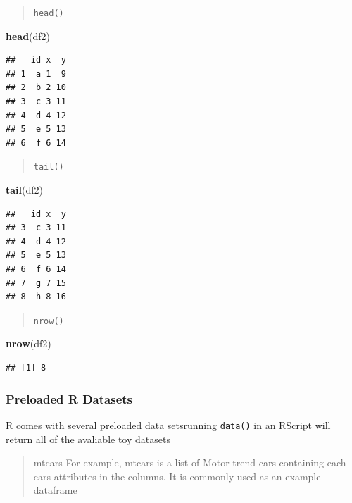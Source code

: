 \documentclass[
]{article}
\newenvironment{Shaded}{\begin{snugshade}}{\end{snugshade}}
\newcommand{\KeywordTok}[1]{\textcolor[rgb]{0.13,0.29,0.53}{\textbf{#1}}}
\newcommand{\NormalTok}[1]{#1}
\begin{document}
\begin{quote}
\texttt{head()}
\end{quote}

\begin{Shaded}
\begin{Highlighting}[]
\KeywordTok{head}\NormalTok{(df2)}
\end{Highlighting}
\end{Shaded}

\begin{verbatim}
##   id x  y
## 1  a 1  9
## 2  b 2 10
## 3  c 3 11
## 4  d 4 12
## 5  e 5 13
## 6  f 6 14
\end{verbatim}

\begin{quote}
\texttt{tail()}
\end{quote}

\begin{Shaded}
\begin{Highlighting}[]
\KeywordTok{tail}\NormalTok{(df2)}
\end{Highlighting}
\end{Shaded}

\begin{verbatim}
##   id x  y
## 3  c 3 11
## 4  d 4 12
## 5  e 5 13
## 6  f 6 14
## 7  g 7 15
## 8  h 8 16
\end{verbatim}

\begin{quote}
\texttt{nrow()}
\end{quote}

\begin{Shaded}
\begin{Highlighting}[]
\KeywordTok{nrow}\NormalTok{(df2)}
\end{Highlighting}
\end{Shaded}

\begin{verbatim}
## [1] 8
\end{verbatim}

\hypertarget{preloaded-r-datasets}{%
\subsubsection{\texorpdfstring{\textbf{Preloaded R
Datasets}}{Preloaded R Datasets}}\label{preloaded-r-datasets}}

R comes with several preloaded data setsrunning \texttt{data()} in an
RScript will return all of the avaliable toy datasets

\begin{quote}
mtcars For example, mtcars is a list of Motor trend cars containing each
cars attributes in the columns. It is commonly used as an example
dataframe
\end{quote}
\end{document}
